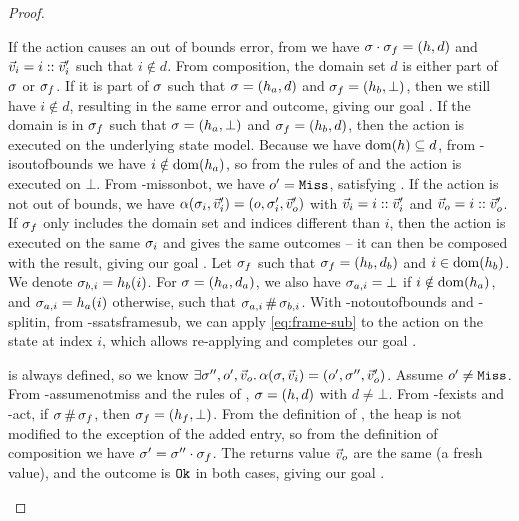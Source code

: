 \begin{proof}
\pfcase{$\alpha\in\actions_\mmdl$}

\begin{hypvlist}
 If the action causes an out of bounds error, from  we have $\sigma\cdot \sigma_f=(h,d)$ and $\vec{v}_i=i::\vec{v}_i'$ such that $i\notin d$.
 From composition, the domain set $d$ is either part of $\sigma$ or $\sigma_f$. If it is part of $\sigma$ such that $\sigma=(h_a, d)$ and $\sigma_f=(h_b, \bot)$, then we still have $i\notin d$, resulting in the same error and outcome, giving our goal .
 If the domain is in $\sigma_f$ such that $\sigma=(h_a,\bot)$ and $\sigma_f=(h_b,d)$, then the action is executed on the underlying state model. Because we have $\operatorname{dom}(h)\subseteq d$, from \hyp{isoutofbounds} we have $i\notin \operatorname{dom}(h_a)$, so from the rules of  and  the action is executed on $\bot$. From \hyp{missonbot}, we have $o'=\texttt{Miss}$, satisfying .
 If the action is not out of bounds, we have $\alpha(\sigma_i,\vec{v}_i')=(o,\sigma_i',\vec{v}_o')$ with $\vec{v}_i=i::\vec{v}_i'$ and $\vec{v}_o=i::\vec{v}_o'$.
 If $\sigma_f$ only includes the domain set and indices different than $i$, then the action is executed on the same $\sigma_i$ and gives the same outcomes -- it can then be composed with the result, giving our goal .
 Let $\sigma_f$ such that $\sigma_f=(h_b,d_b)$ and $i\in\operatorname{dom}(h_b)$. We denote $\sigma_{b,i}=h_b(i)$. For $\sigma=(h_a,d_a)$, we also have $\sigma_{a,i}=\bot$ if $i\notin \operatorname{dom}(h_a)$, and $\sigma_{a,i}=h_a(i)$ otherwise, such that $\sigma_{a,i}\operatorname{\#}\sigma_{b,i}$.
 With \hyp{notoutofbounds} and \hyp{splitin}, from \hyp{ssatsframesub}, we can apply \ref{eq:frame-sub} to the action on the state at index $i$, which allows re-applying  and completes our goal .
\end{hypvlist}

\pfcase{$\alpha=\alloc$}

\begin{hypvlist}
 \alloc{} is always defined, so we know $\exists \sigma'',o',\vec{v}_o\ldotp \alpha(\sigma,\vec{v}_i)=(o',\sigma'',\vec{v}_o')$.
 Assume $o'\neq\texttt{Miss}$.
 From \hyp{assumenotmiss} and the rules of \alloc{}, $\sigma=(h,d)$ with $d\neq\bot$.
 From \hyp{fexists} and \hyp{act}, if $\sigma\operatorname{\#}\sigma_f$, then $\sigma_f=(h_f,\bot)$.
 From the definition of \alloc{}, the heap is not modified to the exception of the added entry, so from the definition of composition we have $\sigma'=\sigma''\cdot\sigma_f$. The returns value $\vec{v}_o$ are the same (a fresh value), and the outcome is $\texttt{Ok}$ in both cases, giving our goal .
\end{hypvlist}


\end{proof}
